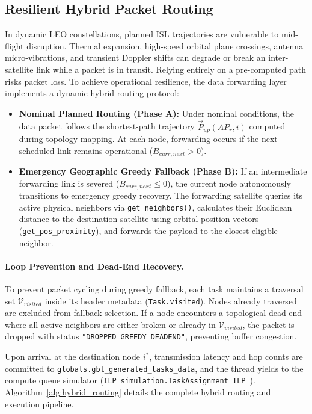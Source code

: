 \subsection{Resilient Hybrid Packet Routing}
\label{subsec:hybrid_routing}

In dynamic LEO constellations, planned ISL trajectories are vulnerable to mid-flight disruption. 
Thermal expansion, high-speed orbital plane crossings, antenna micro-vibrations, and transient Doppler shifts can degrade or break an inter-satellite link while a packet is in transit. 
Relying entirely on a pre-computed path risks packet loss. 
To achieve operational resilience, the data forwarding layer implements a dynamic hybrid routing protocol:
\begin{itemize}
    \item \textbf{Nominal Planned Routing (Phase A):} Under nominal conditions, the data packet follows the shortest-path trajectory $\vec{P}_{up}(AP_r, i)$ computed during topology mapping. At each node, forwarding occurs if the next scheduled link remains operational ($B_{curr, next} > 0$).
    \item \textbf{Emergency Geographic Greedy Fallback (Phase B):} If an intermediate forwarding link is severed ($B_{curr, next} \le 0$), the current node autonomously transitions to emergency greedy recovery. 
    The forwarding satellite queries its active physical neighbors via \texttt{get\_neighbors()}, calculates their Euclidean distance to the destination satellite using orbital position vectors (\texttt{get\_pos\_proximity}), and forwards the payload to the closest eligible neighbor.
\end{itemize}

\paragraph{Loop Prevention and Dead-End Recovery.} 
To prevent packet cycling during greedy fallback, each task maintains a traversal set $\mathcal{V}_{visited}$ inside its header metadata (\texttt{Task.visited}). 
Nodes already traversed are excluded from fallback selection. 
If a node encounters a topological dead end where all active neighbors are either broken or already in $\mathcal{V}_{visited}$, the packet is dropped with status \texttt{"DROPPED\_GREEDY\_DEADEND"}, preventing buffer congestion.

Upon arrival at the destination node $i^*$, transmission latency and hop counts are committed to \texttt{globals.gbl\_generated\_tasks\_data}, and the thread yields to the compute queue simulator (\texttt{ILP\_simulation.TaskAssignment\_ILP}~\cite{bagini_repo_2026}). 
Algorithm~\ref{alg:hybrid_routing} details the complete hybrid routing and execution pipeline.

